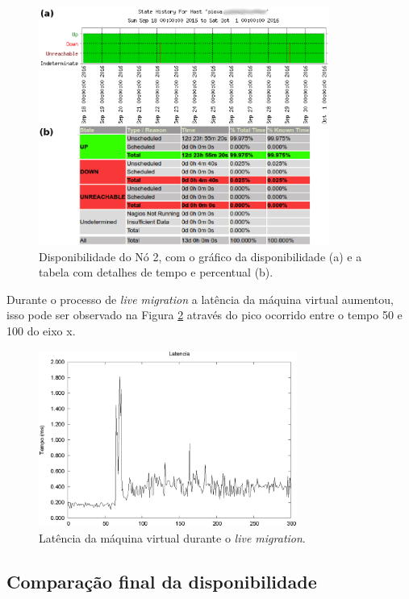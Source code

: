 \begin{figure}[h!]
 \centering
 \includegraphics[width=360px]{img/teste2_piova1.eps}
 \caption{Disponibilidade do Nó 2, com o gráfico da disponibilidade (a) e a tabela com detalhes de tempo e percentual (b).}
 \label{fig:teste2_piova1}
\end{figure}

Durante o processo de \textit{live migration} a latência da máquina virtual aumentou, isso pode ser observado na Figura 
\ref{fig:teste2_latencia} através do pico ocorrido entre o tempo 50 e 100 do eixo x.
\begin{figure}[h!]
 \centering
 \includegraphics[width=320px]{img/teste2_latencia.eps}
 \caption{Latência da máquina virtual durante o \textit{live migration}.}
 \label{fig:teste2_latencia}
\end{figure}



\subsection{Comparação final da disponibilidade}
\label{section:comparacaofinal}

